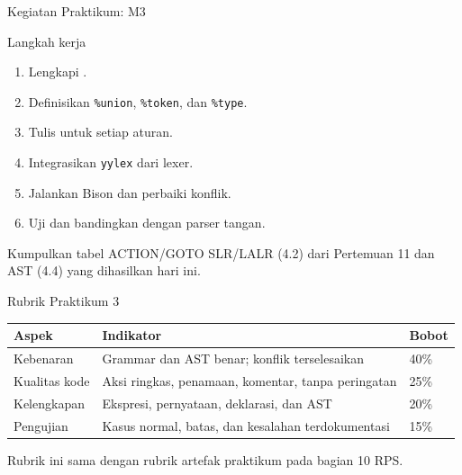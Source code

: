 \documentclass[aspectratio=169,10pt,t]{beamer}
\begin{document}
\begin{frame}{Kegiatan Praktikum: M3}
  \begin{block}{Langkah kerja}
    \footnotesize
    \begin{enumerate}
      \setlength{\itemsep}{1pt}
      \item Lengkapi .
      \item Definisikan \texttt{\%union}, \texttt{\%token}, dan
            \texttt{\%type}.
      \item Tulis  untuk setiap aturan.
      \item Integrasikan \texttt{yylex} dari lexer.
      \item Jalankan Bison dan perbaiki konflik.
      \item Uji dan bandingkan dengan parser tangan.
    \end{enumerate}
  \end{block}

  \vspace{2pt}
  {\footnotesize\color{ubbblue!80}Kumpulkan tabel ACTION/GOTO SLR/LALR
  (4.2) dari Pertemuan 11 dan AST (4.4) yang dihasilkan hari ini.}
\end{frame}

\begin{frame}{Rubrik Praktikum 3}
  \small
  \setlength{\tabcolsep}{4pt}
  \begin{tabular}{@{}p{3.4cm}p{8.6cm}p{1.8cm}@{}}
    \toprule
    \textbf{Aspek} & \textbf{Indikator} & \textbf{Bobot} \\
    \midrule
    Kebenaran & Grammar dan AST benar; konflik terselesaikan & 40\% \\
    Kualitas kode & Aksi ringkas, penamaan, komentar, tanpa
      peringatan & 25\% \\
    Kelengkapan & Ekspresi, pernyataan, deklarasi, dan AST & 20\% \\
    Pengujian & Kasus normal, batas, dan kesalahan terdokumentasi &
      15\% \\
    \bottomrule
  \end{tabular}

  \vspace{5pt}
  {\footnotesize\color{ubbblue!80}Rubrik ini sama dengan rubrik artefak
  praktikum pada bagian 10 RPS.}
\end{frame}
\end{document}
